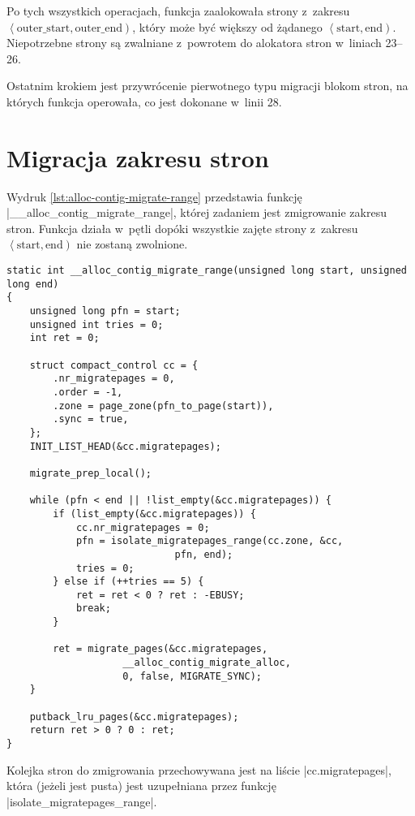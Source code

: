 Po tych wszystkich operacjach, funkcja zaalokowała strony z~zakresu
$\left<\mathrm{outer\_start}, \mathrm{outer\_end}\right)$, który może
być większy od żądanego $\left<\mathrm{start}, \mathrm{end}\right)$.
Niepotrzebne strony są zwalniane z~powrotem do alokatora stron
w~liniach 23--26.

Ostatnim krokiem jest przywrócenie pierwotnego typu migracji blokom
stron, na których funkcja operowała, co jest dokonane w~linii 28.


\section{Migracja zakresu stron}\label{sec:alloc-contig-migrate-range}


Wydruk \ref{lst:alloc-contig-migrate-range} przedstawia funkcję
\code|__alloc_contig_migrate_range|, której zadaniem jest zmigrowanie
zakresu stron.  Funkcja działa w~pętli dopóki wszystkie zajęte strony
z~zakresu $\left<\mathrm{start}, \mathrm{end}\right)$ nie zostaną
zwolnione.


\begin{lstlisting}[float=tbhp,caption={Skrócony wydruk funkcji
    \code|__alloc_conting_migrate_range| z Linuksa 3.5.},label=lst:alloc-contig-migrate-range]
static int __alloc_contig_migrate_range(unsigned long start, unsigned long end)
{
	unsigned long pfn = start;
	unsigned int tries = 0;
	int ret = 0;

	struct compact_control cc = {
		.nr_migratepages = 0,
		.order = -1,
		.zone = page_zone(pfn_to_page(start)),
		.sync = true,
	};
	INIT_LIST_HEAD(&cc.migratepages);

	migrate_prep_local();

	while (pfn < end || !list_empty(&cc.migratepages)) {
		if (list_empty(&cc.migratepages)) {
			cc.nr_migratepages = 0;
			pfn = isolate_migratepages_range(cc.zone, &cc,
							 pfn, end);
			tries = 0;
		} else if (++tries == 5) {
			ret = ret < 0 ? ret : -EBUSY;
			break;
		}

		ret = migrate_pages(&cc.migratepages,
				    __alloc_contig_migrate_alloc,
				    0, false, MIGRATE_SYNC);
	}

	putback_lru_pages(&cc.migratepages);
	return ret > 0 ? 0 : ret;
}
\end{lstlisting}

Kolejka stron do zmigrowania przechowywana jest na liście
\code|cc.migratepages|, która (jeżeli jest pusta) jest uzupełniana
przez funkcję \code|isolate_migratepages_range|.

